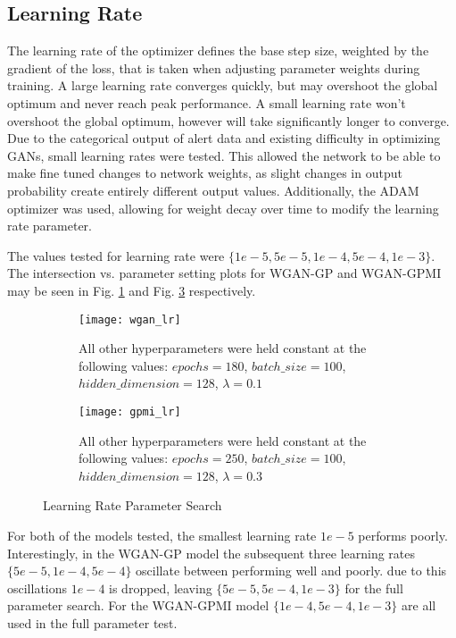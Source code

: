 \subsection{Learning Rate}
\label{sec:lr}

The learning rate of the optimizer defines the base step size, weighted by the gradient of the loss, that is taken when adjusting parameter weights during training. A large learning rate converges quickly, but may overshoot the global optimum and never reach peak performance. A small learning rate won't overshoot the global optimum, however will take significantly longer to converge. Due to the categorical output of alert data and existing difficulty in optimizing GANs, small learning rates were tested. This allowed the network to be able to make fine tuned changes to network weights, as slight changes in output probability create entirely different output values. Additionally, the ADAM optimizer was used, allowing for weight decay over time to modify the learning rate parameter.


The values tested for learning rate were $\{1e-5, 5e-5, 1e-4, 5e-4, 1e-3\}$. The intersection vs. parameter setting plots for WGAN-GP and WGAN-GPMI may be seen in Fig. \ref{fig:wgan_lr} and Fig. \ref{fig:gpmi_lr} respectively.

\begin{figure}[!htbp]
	\centering
	\begin{subfigure}{.7\textwidth}
		\texttt{[image: wgan\_lr]}
	\end{subfigure}%
	\begin{subfigure}{.3\textwidth}
		\caption{
			All other hyperparameters were held constant at the following values: $epochs=180$, $batch\_size = 100$, $hidden\_dimension=128$, $\lambda=0.1$
		}
		\label{fig:wgan_lr}
	\end{subfigure}%

	\begin{subfigure}{.7\textwidth}
		\texttt{[image: gpmi\_lr]}
	\end{subfigure}%
	\begin{subfigure}{.3\textwidth}
		\caption{
			All other hyperparameters were held constant at the following values: $epochs=250$, $batch\_size=100$, $hidden\_dimension=128$, $\lambda=0.3$
		}
		\label{fig:gpmi_lr}
	\end{subfigure}%
	\caption{Learning Rate Parameter Search}
\end{figure}

For both of the models tested, the smallest learning rate $1e-5$ performs poorly. Interestingly, in the WGAN-GP model the subsequent three learning rates $\{5e-5,1e-4,5e-4\}$ oscillate between performing well and poorly. due to this oscillations $1e-4$ is dropped, leaving $\{5e-5,5e-4,1e-3\}$ for the full parameter search. For the WGAN-GPMI model $\{1e-4, 5e-4, 1e-3\}$ are all used in the full parameter test.


